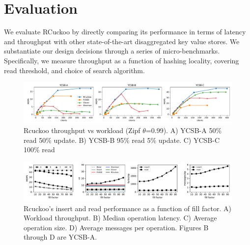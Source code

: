 \section{Evaluation}
\label{sec:eval}

We evaluate RCuckoo by directly comparing its performance in terms of
latency and throughput with other state-of-the-art disaggregated key
value stores. We substantiate our design decisions through a series of
micro-benchmarks. Specifically, we measure throughput as a function of
hashing locality, covering read threshold, and choice of search
algorithm.



\begin{figure}[ht]
    \includegraphics[width=0.99\linewidth]{fig/hero_ycsb_throughput.pdf}

    \caption{Rcuckoo throughput vs workload (Zipf $\theta$=0.99). A) YCSB-A 50\%
    read 50\% update. B) YCSB-B 95\% read 5\% update. C)
    YCSB-C 100\% read}
    \label{fig:ycsb_throughput}
 \end{figure}

\begin{figure}[ht]
    \includegraphics[width=0.99\linewidth]{fig/hero_ycsb_fill.pdf}

    \caption{Rcuckoo's insert and read performance as a
    function of fill factor. A) Workload throughput. B)
    Median operation latency. C) Average operation size. D)
    Average messages per operation. Figures B through D are
    YCSB-A.}

    \label{fig:ycsb_fill}
\end{figure}


